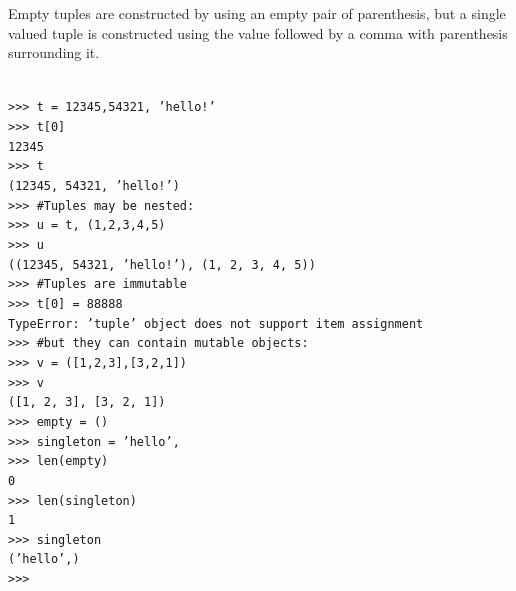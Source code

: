 \documentclass[12pt,a4paper]{article}
\begin{document}
Empty tuples are constructed by using an empty pair of parenthesis, but a single valued tuple is constructed using the value followed by a comma with parenthesis surrounding it.

\texttt{\\
>>> t = 12345,54321, 'hello!'\\
>>> t[0]\\
12345\\
>>> t\\
(12345, 54321, 'hello!')\\
>>> \#Tuples may be nested:\\
>>> u = t, (1,2,3,4,5)\\
>>> u\\
((12345, 54321, 'hello!'), (1, 2, 3, 4, 5))\\
>>> \#Tuples are immutable\\
>>> t[0] = 88888\\
TypeError: 'tuple' object does not support item assignment\\
>>> \#but they can contain mutable objects:\\
>>> v = ([1,2,3],[3,2,1])\\
>>> v\\
([1, 2, 3], [3, 2, 1])\\
>>> empty = ()\\
>>> singleton = 'hello',\\
>>> len(empty)\\
0\\
>>> len(singleton)\\
1\\
>>> singleton\\
('hello',)\\
>>>\\ }
\end{document}
